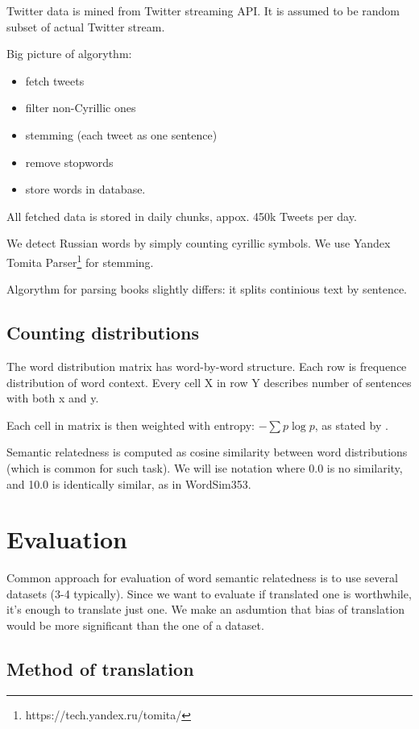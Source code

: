 \documentclass[11pt,letterpaper]{article}
\begin{document}
Twitter data is mined from Twitter streaming API. It is assumed to be random subset of actual Twitter stream.

Big picture of algorythm:
\begin{itemize}
\item fetch tweets
\item filter non-Cyrillic ones
\item stemming (each tweet as one sentence)
\item remove stopwords
\item store words in database.
\end{itemize}

All fetched data is stored in daily chunks, appox. 450k Tweets per day.

We detect Russian words by simply counting cyrillic symbols. We use Yandex Tomita 
Parser\footnote{https://tech.yandex.ru/tomita/} for stemming.

Algorythm for parsing books slightly differs:
it splits continious text by sentence.

\subsection{Counting distributions}

The word distribution matrix has word-by-word structure. 
Each row is frequence distribution of word context. 
Every cell X in row Y describes number of sentences with both x and y.

Each cell in matrix is then weighted with entropy: 
$- \sum p \log p$, as stated by \cite{landauer1998introduction}.

Semantic relatedness is computed as cosine similarity between word distributions 
(which is common for such task).
We will ise notation where 0.0 is no similarity, and 10.0 is identically similar, 
as in WordSim353.

\section{Evaluation}

Common approach for evaluation of word semantic relatedness is to use several datasets (3-4 typically). 
Since we want to evaluate if translated one is worthwhile, it's enough to translate just one. 
We make an asdumtion that bias of translation would be more significant than the one of a dataset.

\subsection{Method of translation}
\end{document}
